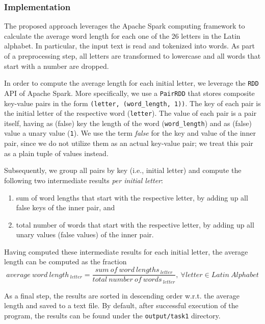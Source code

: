 \documentclass[acmlarge]{acmart}
\begin{document}
  \subsubsection{Implementation}
  The proposed approach leverages the Apache Spark computing framework to calculate the average word length for each one of the 26 letters in the Latin alphabet. In particular, the input text is read and tokenized into words. As part of a preprocessing step, all letters are transformed to lowercase and all words that start with a number are dropped.

  In order to compute the average length for each initial letter, we leverage the \texttt{RDD} API of Apache Spark. More specifically, we use a \texttt{PairRDD} that stores composite key-value pairs in the form \texttt{(letter, (word\_length, 1))}. The key of each pair is the initial letter of the respective word (\texttt{letter}). The value of each pair is a pair itself, having as (false) key the length of the word (\texttt{word\_length}) and as (false) value a unary value (\texttt{1}). We use the term \emph{false} for the key and value of the inner pair, since we do not utilize them as an actual key-value pair; we treat this pair as a plain tuple of values instead.

  Subsequently, we group all pairs by key (i.e., initial letter) and compute the following two intermediate results \emph{per initial letter}:
  \begin{enumerate}
    \item sum of word lengths that start with the respective letter, by adding up all false keys of the inner pair, and
    \item total number of words that start with the respective letter, by adding up all unary values (false values) of the inner pair.
  \end{enumerate}

  Having computed these intermediate results for each initial letter, the average length can be computed as the fraction
  \begin{displaymath}
    average~word~length_{~letter} = \frac{sum~of~word~lengths_{~letter}}{total~number~of~words_{~letter}},~ \forall letter \in Latin~Alphabet
  \end{displaymath}

  As a final step, the results are sorted in descending order w.r.t. the average length and saved to a text file. By default, after successful execution of the program, the results can be found under the \texttt{output/task1} directory.
\end{document}
